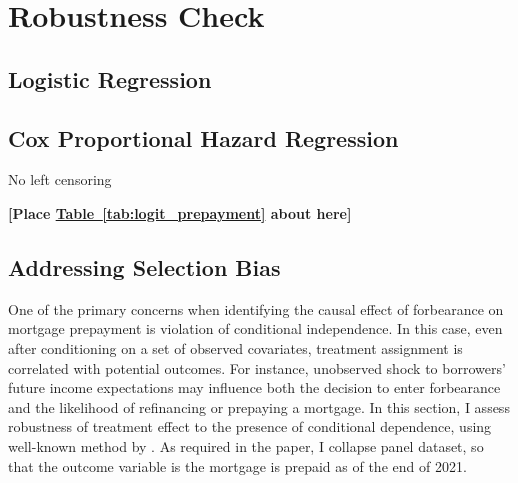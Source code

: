\documentclass[11pt]{article}
\begin{document}
{\label{sec:further_analysis}


\section{Robustness Check} \label{sec:Robustness}

\subsection{Logistic Regression}

\subsection{Cox Proportional Hazard Regression}

No left censoring 

\bigskip
\centerline{\bf [Place \hyperref[tab:logit_prepayment]{Table~\ref*{tab:logit_prepayment}} about here]}
\bigskip




\subsection{Addressing Selection Bias}

One of the primary concerns when identifying the causal effect of forbearance on mortgage prepayment is violation of conditional independence. In this case, even after conditioning on a set of observed covariates, treatment assignment is correlated with potential outcomes. For instance, unobserved shock to borrowers' future income expectations may influence both the decision to enter forbearance and the likelihood of refinancing or prepaying a mortgage. In this section, I assess robustness of treatment effect to the presence of conditional dependence, using well-known method by \citet{oster2019}. As required in the paper, I collapse panel dataset, so that the outcome variable is the mortgage is prepaid as of the end of 2021.



}
\end{document}
